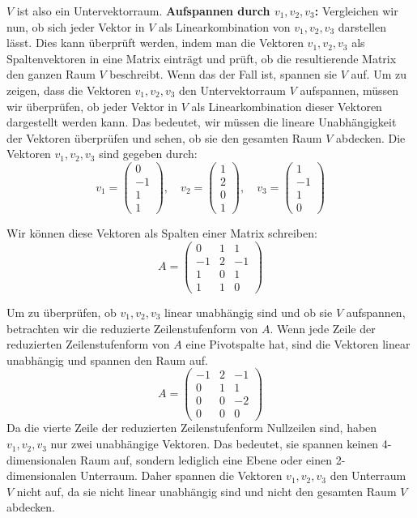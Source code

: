 \documentclass[a4paper]{scrartcl}
\newcounter{spalte}
\newcounter{zeile}
\begin{document}
$V$ ist also ein Untervektorraum.
\textbf{Aufspannen durch $v_1, v_2, v_3$:}
Vergleichen wir nun, ob sich jeder Vektor in $V$ als Linearkombination von $v_1, v_2, v_3$ darstellen lässt. Dies kann überprüft werden, indem man die Vektoren $v_1, v_2, v_3$ als Spaltenvektoren in eine Matrix einträgt und prüft, ob die resultierende Matrix den ganzen Raum $V$ beschreibt. Wenn das der Fall ist, spannen sie $V$ auf.
Um zu zeigen, dass die Vektoren $v_1, v_2, v_3$ den Untervektorraum $V$ aufspannen, müssen wir überprüfen, ob jeder Vektor in $V$ als Linearkombination dieser Vektoren dargestellt werden kann. Das bedeutet, wir müssen die lineare Unabhängigkeit der Vektoren überprüfen und sehen, ob sie den gesamten Raum $V$ abdecken.
Die Vektoren $v_1, v_2, v_3$ sind gegeben durch:
\[ v_1 = \begin{pmatrix} 0 \\ -1 \\ 1 \\ 1 \end{pmatrix}, \quad v_2 = \begin{pmatrix} 1 \\ 2 \\ 0 \\ 1 \end{pmatrix}, \quad v_3 = \begin{pmatrix} 1 \\ -1 \\ 1 \\ 0 \end{pmatrix} \]

Wir können diese Vektoren als Spalten einer Matrix schreiben:
\[ A = \begin{pmatrix} 0 & 1 & 1 \\ -1 & 2 & -1 \\ 1 & 0 & 1 \\ 1 & 1 & 0 \end{pmatrix} \]

Um zu überprüfen, ob $v_1, v_2, v_3$ linear unabhängig sind und ob sie $V$ aufspannen, betrachten wir die reduzierte Zeilenstufenform von $A$. Wenn jede Zeile der reduzierten Zeilenstufenform von $A$ eine Pivotspalte hat, sind die Vektoren linear unabhängig und spannen den Raum auf.
\[ A = \begin{pmatrix} -1 & 2 & -1 \\ 0 & 1 & 1 \\ 0 & 0 & -2 \\ 0 & 0 & 0 \end{pmatrix} \]
Da die vierte Zeile der reduzierten Zeilenstufenform Nullzeilen sind, haben $v_1, v_2, v_3$ nur zwei unabhängige Vektoren. Das bedeutet, sie spannen keinen 4-dimensionalen Raum auf, sondern lediglich eine Ebene oder einen 2-dimensionalen Unterraum.
Daher spannen die Vektoren $v_1, v_2, v_3$ den Unterraum $V$ nicht auf, da sie nicht linear unabhängig sind und nicht den gesamten Raum $V$ abdecken.
\end{document}
